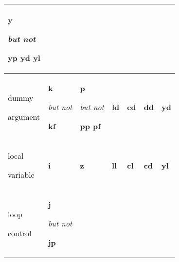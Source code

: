 \begin{table}[htbp]
\begin{center}
\begin{tabular}{|p{50pt}|p{50pt}|p{50pt}|p{50pt}|p{50pt}|p{50pt}|p{50pt}|}
      \textbf{y} \par \textit{but not} \par \textbf{yp yd yl}                                     \\
      \hline
      dummy \par argument                                                                         &
      \textbf{k} \par \textit{but not} \par \textbf{kf}                                           &
      \textbf{p} \par \textit{but not} \par \textbf{pp pf}                                        &
      \textbf{ld}                                                                                 &
      \textbf{cd}                                                                                 &
      \textbf{dd}                                                                                 &
      \textbf{yd}                                                                                 \\
      \hline
      local \par variable                                                                         &
      \textbf{i}                                                                                  &
      \textbf{z}                                                                                  &
      \textbf{ll}                                                                                 &
      \textbf{cl}                                                                                 &
      \textbf{cd}                                                                                 &
      \textbf{yl}                                                                                 \\
      \hline
      loop \par control                                                                           &
      \textbf{j} \par \textit{but not} \par \textbf{jp}                                           &
                                                                                                  &
                                                                                                  &
                                                                                                  &

\end{tabular}
\end{center}
\end{table}
